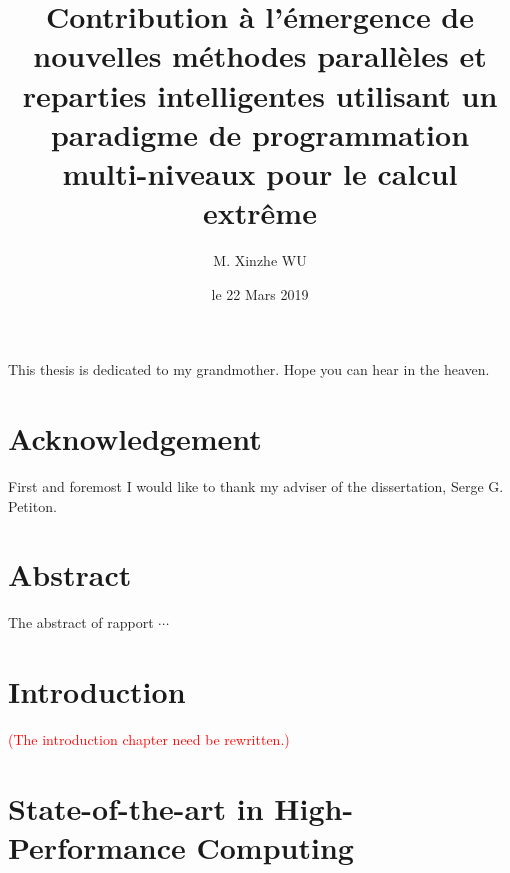 \documentclass{xinzhewu}
\title{\large \textrm{Contribution \`a l’\'emergence de nouvelles m\'ethodes parall\`eles et reparties intelligentes utilisant un paradigme de programmation multi-niveaux pour le calcul extr\^eme}}
\author{M. Xinzhe WU}
\date{le 22 Mars 2019}
\newenvironment{dedication}
{\clearpage           %
	\thispagestyle{empty}%
	\vspace*{\stretch{1}}%
	\itshape             %
	\raggedleft          %
}
{\par %
	\vspace{\stretch{3}} %
	\clearpage           %
}
\begin{document}
\maketitle

\clearemptydoublepage

\begin{dedication}
	This thesis is dedicated to my grandmother. Hope you can hear in the heaven.
\end{dedication}

\clearemptydoublepage

\chapter*{Acknowledgement}
\thispagestyle{empty}
First and foremost I would like to thank my adviser of the dissertation, Serge G. Petiton.

\clearemptydoublepage
\chapter*{Abstract}
\thispagestyle{empty}
The abstract of rapport $\cdots$

\clearemptydoublepage


\clearemptydoublepage

\frontmatter

\tableofcontents

\listoffigures
{}

\listoftables
{}


\printnomenclature

\mainmatter %

\chapter{Introduction}

\textcolor{red}{(The introduction chapter need be rewritten.)}



\chapter{State-of-the-art in High-Performance Computing}
\end{document}
